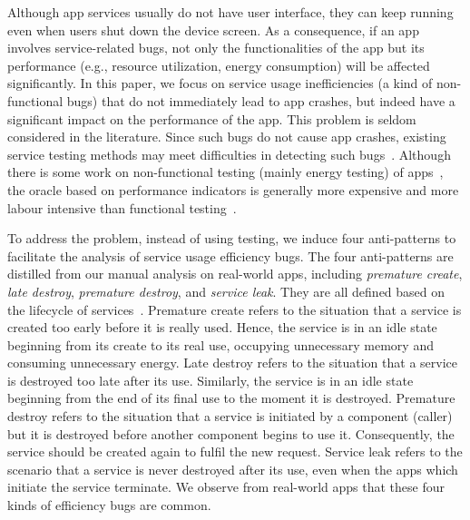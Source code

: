 \documentclass[sigconf,review, anonymous]{acmart}
\begin{document}
Although app services usually do not have user interface, they can keep running even when users shut down the device screen. As a  consequence, if an app involves service-related bugs, not only the functionalities of the app but its performance (e.g., resource utilization, energy consumption) will be affected significantly. 
In this paper, we focus on service usage inefficiencies (a kind of non-functional bugs) that do not immediately lead to app crashes, but indeed have a significant impact on the performance of the app. This problem is seldom considered in the literature. Since such bugs do not cause app crashes, existing service testing methods may meet difficulties in detecting such bugs~\cite{ZhangLLC17}. Although there is some work on non-functional testing (mainly energy testing) of apps~\cite{LiuXC14,BanerjeeC0R14,LiuXCL14,BehrouzSBM16,JabbarvandM17}, the oracle based on performance indicators is generally more expensive and more labour intensive than functional testing~\cite{BehrouzSBM16}.
 


To address the problem, instead of using testing, we induce four anti-patterns to facilitate the analysis of service usage efficiency bugs. The four anti-patterns are distilled from our manual analysis on real-world apps, including \textit{premature create}, \textit{late destroy}, \textit{premature destroy}, and \textit{service leak}. They are all defined based on the lifecycle of services~\cite{Androidservice}. Premature create refers to the situation that a service is created too early before it is really used. Hence, the service is in an idle state beginning from its create to its real use, occupying unnecessary memory and consuming unnecessary energy. Late destroy refers to the situation that a service is destroyed too late after its use. Similarly, the service is in an idle state beginning from the end of its final use to the moment it is destroyed. Premature destroy refers to the situation that a service is initiated by a component (caller) but it is destroyed before another component begins to use it. Consequently, the service should be created again to fulfil the new request. Service leak refers to the scenario that a service is never destroyed after its use, even when the apps which initiate the service terminate. We observe from real-world apps that these four kinds of efficiency bugs are common.
\end{document}
